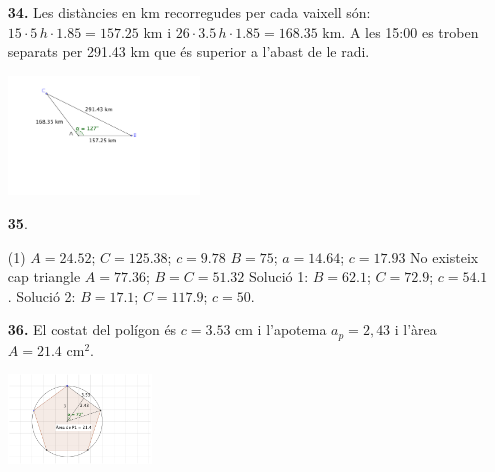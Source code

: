 \documentclass[a4paper, pdf, twoside]{book}
\begin{document}
\begin{multicols}{2}
\begin{enumerate}
\vspace{0.25cm}
\item[\fontfamily{phv}\selectfont\color{blue}\textbf{34. }] 
Les distàncies en km recorregudes per cada vaixell són: $15\cdot 5 \, h \cdot 1.85=157.25$ km i $26\cdot 3.5 \,h \cdot 1.85=168.35$ km. A les 15:00 es troben separats per 291.43 km que és superior a l'abast de le radi.\par \includegraphics [width=0.4\textwidth ]{img-sol/t3-34}
\vspace{0.25cm}



 \item[\fontfamily{phv}\selectfont\color{blue}\textbf{35}. ] 
 \begin{tasks}[column-sep=1em, item-indent=1.3333em](1)
	 \task*  $A=24.52$; $C=125.38$; $c=9.78$
	 \task $B=75$; $a=14.64$; $c=17.93$
	 \task No existeix cap triangle
	 \task $A=77.36$; $B=C=51.32$
	 \task* Solució 1: $B=62.1$; $C=72.9$; $c=54.1$. Solució 2: $B=17.1$; $C=117.9$; $c=50$.
\end{tasks}
\vspace{0.25cm}
\item[\fontfamily{phv}\selectfont\color{blue}\textbf{36. }] 
El costat del polígon és $c=3.53$ cm i l'apotema $a_p=2,43$ i l'àrea $A=21.4$ cm$^2$.\par \includegraphics [width=0.3\textwidth ]{img-sol/t3-36}
 \end{enumerate}
\vspace{0.3cm}



\end{multicols}
\end{document}
